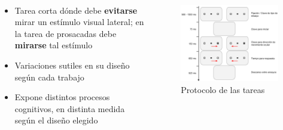 \documentclass[aspectratio=169]{beamer}
\begin{document}
\begin{frame}{~}

  \begin{columns}
  \begin{column}{.5\textwidth}
    \begin{itemize}
      \item Tarea corta dónde debe \textbf{evitarse} mirar un estímulo visual
        lateral; en la tarea de prosacadas debe \textbf{mirarse} tal estímulo

      \item Variaciones sutiles en su diseño según cada trabajo

      \item Expone distintos procesos cognitivos, en distinta medida según el diseño elegido
    \end{itemize}
  \end{column}
  \begin{column}{.5\textwidth}
    \begin{figure}
      \centering
      \includegraphics[width=\linewidth]{img/antisaccades-protocol.png}
      \caption{Protocolo de las tareas}
    \end{figure}
  \end{column}
  \end{columns}

\end{frame}
\end{document}
